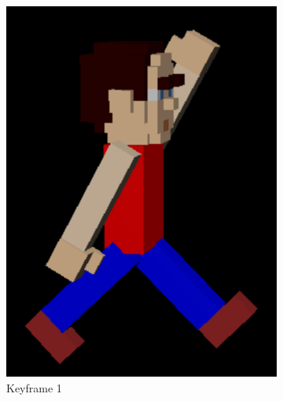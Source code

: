 \documentclass[12pt]{article}
\begin{document}
\begin{figure}[h]
\centering
\begin{subfigure}{.33\textwidth}
  \centering
  \includegraphics[width=.9\linewidth]{1}
  \caption{Keyframe 1}
  \label{fig:key1}
\end{subfigure}%
\begin{subfigure}{.33\textwidth}
  \centering

\end{subfigure}
\end{figure}
\end{document}
